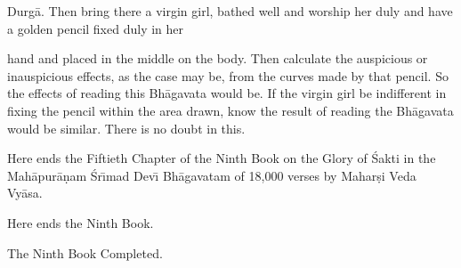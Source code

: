 Durg\=a. Then bring there a virgin girl, bathed well and worship her duly and have a golden pencil fixed duly in her

hand and placed in the middle on the body. Then calculate the auspicious or inauspicious effects, as the case may be, from the curves made by that pencil. So the effects of reading this Bh\=agavata would be. If the virgin girl be indifferent in fixing the pencil within the area drawn, know the result of reading the Bh\=agavata would be similar. There is no doubt in this.

Here ends the Fiftieth Chapter of the Ninth Book on the Glory of \'Sakti in the Mah\=apur\=a\d{n}am \'Sr\={\i}mad Dev\={\i} Bh\=agavatam of 18,000 verses by Mahar\d{s}i Veda Vy\=asa.

Here ends the Ninth Book.

The Ninth Book Completed.



